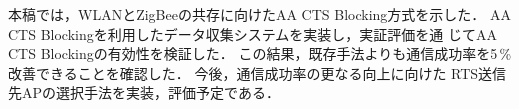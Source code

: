 \documentclass[technicalreport]{ieicej}
\begin{document}
本稿では，WLANとZigBeeの共存に向けたAA CTS Blocking方式を示した．
AA CTS Blockingを利用したデータ収集システムを実装し，実証評価を通
じてAA CTS Blockingの有効性を検証した．
この結果，既存手法よりも通信成功率を5\,\%改善できることを確認した．
今後，通信成功率の更なる向上に向けた
RTS送信先APの選択手法を実装，評価予定である．


%
%
\end{document}
